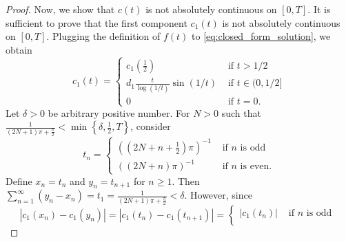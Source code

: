 \documentclass{article}
\theoremstyle{definition}
\newcommand{\pr}[1]{ \left( #1 \right) }
\newcommand{\abs}[1]{\left| #1 \right|}
\newcommand{\set}[1]{\left\{#1\right\}}
\begin{document}
\begin{proof}
    Now, we show that $c(t)$ is not absolutely continuous on $[0,T]$. It is sufficient to prove that the first component $c_1(t)$ is not absolutely continuous on $[0,T]$. 
    Plugging the definition of $f(t)$ to \eqref{eq:closed_form_solution}, we obtain
    \begin{equation*}
        c_1(t) = \begin{cases}
            c_1\pr{ \frac{1}{2} } & \text{ if } t>1/2 \\
            d_1 \frac{t}{\log(1/t)} \sin(1/t) & \text{ if } t\in (0,1/2] \\
            0 & \text{ if } t=0.
        \end{cases}
    \end{equation*}
    Let $\delta>0$ be arbitrary positive number. 
    For $N>0$ such that $\frac{1}{(2N+1) \pi + \frac{\pi}{2}} < \min\set{\delta,\frac{1}{2},T}$,  consider
    \begin{equation*}
        t_n = \begin{cases}
           \pr{ (2N+n+\frac{1}{2})\pi }^{-1} & \text{ if } n \text{ is odd } \\
            \pr{ (2N+n)\pi }^{-1} & \text{ if } n \text{ is even} .
        \end{cases}
    \end{equation*}
    Define $x_n = t_n$ and $y_n=t_{n+1}$ for $n\ge1$. 
    Then $\sum_{n=1}^{\infty} \pr{ y_{n} - x_{n} } = t_1
         = \frac{1}{(2N+1) \pi + \frac{\pi}{2}}< \delta$.
    However, since
    \begin{equation*}
        \abs{ c_1(x_n) - c_1(y_{n}) } 
        = \abs{ c_1(t_n) - c_1(t_{n+1}) }
        = \begin{cases}
            \abs{c_1(t_n)} & \text{ if $n$ is odd }   \\

\end{cases}
\end{equation*}
\end{proof}
\end{document}
